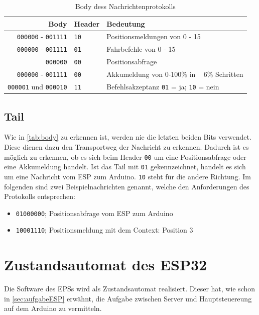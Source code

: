 \begin{table}[h]
	\begin{center}
		\begin{tabular}{r | l | l}
			Body & Header & Bedeutung \\
			\hline
			\texttt{000000} - \texttt{001111} & \texttt{10} & Positionsmeldungen von 0 - 15 \\
			\hline
			\texttt{000000} - \texttt{001111} & \texttt{01} & Fahrbefehle von 0 - 15 \\
			\hline
			\texttt{000000} & \texttt{00} & Positionsabfrage \\
			\hline
			\texttt{000000} - \texttt{001111} & \texttt{00} & Akkumeldung von 0-100\% in ~ 6\% Schritten \\
			\hline
			\texttt{000001} und \texttt{000010} & \texttt{11} & Befehlsakzeptanz \texttt{01} = ja; \texttt{10} = nein\\  
		\end{tabular}
	\end{center}
	\caption{\label{tab:body}Body dess Nachrichtenprotokolls}
\end{table}

\subsection{Tail}
Wie in \autoref{tab:body} zu erkennen ist, werden nie die letzten beiden Bits verwendet. Diese dienen dazu den Transportweg der Nachricht zu erkennen. Dadurch ist es möglich zu erkennen, ob es sich beim Header \texttt{00} um eine Positionsabfrage oder eine Akkumeldung handelt.
Ist das Tail mit \texttt{01} gekennzeichnet, handelt es sich um eine Nachricht vom ESP zum Arduino. \texttt{10} steht für die andere Richtung.
Im folgenden sind zwei Beispielnachrichten genannt, welche den Anforderungen des Protokolls entsprechen:

\begin{center}
	\begin{itemize}
		\item \texttt{01000000}; Positionsabfrage vom ESP zum Arduino
		\item \texttt{10001110}; Positionsmeldung mit dem Context: Position 3  
	\end{itemize}
\end{center}
\newpage
\section{Zustandsautomat des ESP32}
\label{sec:stateESP}
Die Software des EPSs wird als Zustandsautomat realisiert. Dieser hat, wie schon in \autoref{sec:aufgabeESP} erwähnt, die Aufgabe zwischen Server und Hauptsteuereung auf dem Arduino zu vermitteln.

